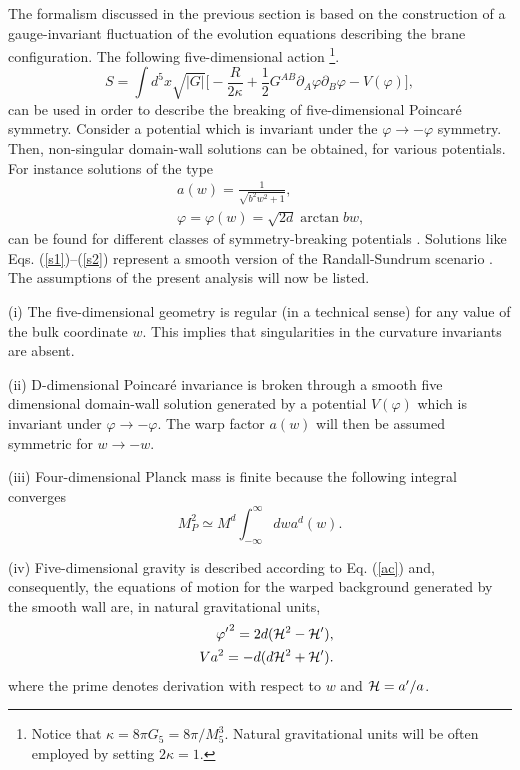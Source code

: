 \documentclass[a4paper,12pt]{article}
\begin{document}
The formalism discussed in the previous 
section is based on the construction of a gauge-invariant fluctuation
of the evolution equations describing the 
brane configuration.
The following five-dimensional action \footnote{Notice that 
 $\kappa = 8\pi G_{5} = 8\pi/M_{5}^3$. Natural gravitational 
units will be often employed by setting $2 \kappa =1$.}. 
\begin{equation}
S= \int d^{5}x \sqrt{|G|}\biggl[- \frac{R}{2\kappa} + \frac{1}{2} G^{A B} 
\partial_{A} \varphi \partial_{B} \varphi - V(\varphi)\biggr],
\label{ac}
\end{equation}
can be used in order to describe the breaking of five-dimensional Poincar\'e 
symmetry. Consider a potential which is invariant under the 
$\varphi \rightarrow -\varphi$ symmetry. Then, non-singular domain-wall 
solutions can be obtained, for various potentials.
For instance solutions of the type 
\begin{eqnarray}
&& a(w) = \frac{1}{\sqrt{b^2 w^2 + 1}},
\label{s1}\\
&& \varphi = \varphi(w) = \sqrt{2 d} \arctan{b w},
\label{s2}
\end{eqnarray}
can be found for different classes of symmetry-breaking 
 potentials \cite{gremm1,kt1,free}.  Solutions like Eqs. 
(\ref{s1})--(\ref{s2}) represent a smooth  version of the Randall-Sundrum
scenario \cite{rs,rs2}.
The assumptions of the present analysis will now be listed. 

(i) The five-dimensional geometry is regular (in a technical sense)
for any value of the bulk coordinate $w$. This implies that singularities 
in the curvature invariants are absent.

(ii) D-dimensional Poincar\'e invariance is broken 
through a smooth five dimensional domain-wall solution generated 
by a potential $V(\varphi)$ which is invariant under 
$\varphi \rightarrow - \varphi$. The warp factor $a(w)$ will 
then be assumed symmetric for $w\rightarrow - w$.

(iii) Four-dimensional Planck mass is finite because the following integral
converges
\begin{equation}
M^2_{P} \simeq M^d \int_{-\infty}^{\infty} dw a^d(w).
\label{pl}
\end{equation}

(iv) Five-dimensional gravity is described according to Eq. (\ref{ac}) 
and, consequently, the equations of motion for the warped background 
generated by the smooth wall are, in natural gravitational units, 
\begin{eqnarray}
&&{\varphi'}^2 = 2 d ( {\cal H}^2 - {\cal H}'), 
\label{c1}\\
&& Va^2 = - d ( d {\cal H}^2 + {\cal H}').
\label{c2}
\end{eqnarray}
where the prime denotes derivation with respect to $w$ and ${\cal H} = a'/a$.
\end{document}
